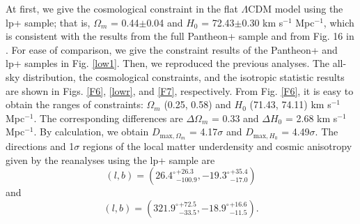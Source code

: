 \documentclass{aa}
\begin{document}
At first, we give the cosmological constraint in the flat $\Lambda$CDM model using the lp+ sample; that is, $\Omega_{m}$ = 0.44$\pm$0.04 and $H_{0}$ = 72.43$\pm$0.30 km s$^{-1}$ Mpc$^{-1}$, which is consistent with the results from the full Pantheon+ sample and from Fig. 16 in \citet{2022ApJ...938..110B}. For ease of comparison, we give the constraint results of the Pantheon+ and lp+ samples in Fig. \ref{low1}. Then, we reproduced the previous analyses. The all-sky distribution, the cosmological constraints, and the isotropic statistic results are shown in Figs. \ref{F6}, \ref{lowr}, and \ref{F7}, respectively. From Fig. \ref{F6}, it is easy to obtain the ranges of constraints: $\Omega_{m}$ (0.25, 0.58) and $H_{0}$ (71.43, 74.11) km s$^{-1}$ Mpc$^{-1}$. The corresponding differences are $\Delta \Omega_{m}$ = 0.33 and $\Delta{H_{0}}$ = 2.68 km s$^{-1}$ Mpc$^{-1}$. By calculation, we obtain $D_{\mathrm{max},\Omega_{m}}$ = 4.17$\sigma$ and $D_{\mathrm{max}, H_{0}}$ = 4.49$\sigma$. The directions and 1$\sigma$ regions of the local matter underdensity and cosmic anisotropy given by the reanalyses using the lp+ sample are 
\begin{equation}
        (l, b) = ({26.4^{\circ}}_{-100.9}^{+26.3}, {-19.3^{\circ}}_{-17.0}^{+35.4})
        \label{lbF6}
\end{equation}
and 
\begin{equation}
        (l, b) = ({321.9^{\circ}}_{-33.5}^{+72.5}, {-18.9^{\circ}}_{-11.5}^{+16.6}).
        \label{lbF6H}
\end{equation} 
\end{document}
